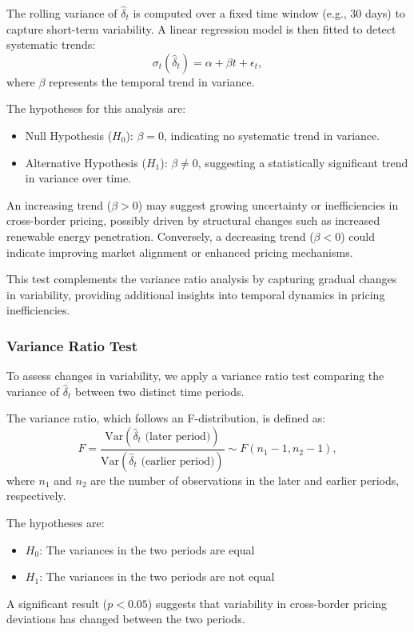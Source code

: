 \documentclass[12pt]{article}
\begin{document}
The rolling variance of $\hat{\delta}_t$ is computed over a fixed time window (e.g., 30 days) to capture short-term variability. A linear regression model is then fitted to detect systematic trends:
\begin{equation}
    \sigma_t(\hat{\delta}_t) = \alpha + \beta t + \epsilon_t,
\end{equation}
where $\beta$ represents the temporal trend in variance. 

The hypotheses for this analysis are:
\begin{itemize}
    \item Null Hypothesis ($H_0$): $\beta = 0$, indicating no systematic trend in variance.
    \item Alternative Hypothesis ($H_1$): $\beta \neq 0$, suggesting a statistically significant trend in variance over time.
\end{itemize}

An increasing trend ($\beta > 0$) may suggest growing uncertainty or inefficiencies in cross-border pricing, possibly driven by structural changes such as increased renewable energy penetration. Conversely, a decreasing trend ($\beta < 0$) could indicate improving market alignment or enhanced pricing mechanisms.

This test complements the variance ratio analysis by capturing gradual changes in variability, providing additional insights into temporal dynamics in pricing inefficiencies.

\subsubsection*{Variance Ratio Test}
To assess changes in variability, we apply a variance ratio test comparing the variance of $\hat{\delta}_t$ between two distinct time periods. 

The variance ratio, which follows an F-distribution, is defined as:
\begin{equation}
    F = \frac{\text{Var}(\hat{\delta}_t \text{ (later period)})}{\text{Var}(\hat{\delta}_t \text{ (earlier period)})} \sim F(n_1 - 1, n_2 - 1),
\end{equation}
where $n_1$ and $n_2$ are the number of observations in the later and earlier periods, respectively.

The hypotheses are:
\begin{itemize}
    \item $H_0$: The variances in the two periods are equal
    \item $H_1$: The variances in the two periods are not equal
\end{itemize}
A significant result ($p < 0.05$) suggests that variability in cross-border pricing deviations has changed between the two periods.
\end{document}
